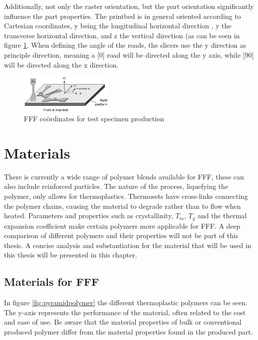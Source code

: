 Additionally, not only the raster orientation, but the part orientation significantly influence the part properties. The printbed is in general oriented according to Cartesian coordinates, y being the longitudinal horizontal direction , y the transverse horizontal direction, and z the vertical direction (as can be seen in figure \ref{fig:coordinates}. When defining the angle of the roads, the slicers use the y direction as principle direction, meaning a [0] road will be directed along the y axis, while [90] will be directed along the x direction. 


\begin{figure}[H]
    \centering
    \includegraphics[width=0.4\textwidth]{chapter_2/figures/Coordinates.png}
    \caption{FFF coördinates for test specimen production}
    \label{fig:coordinates}
\end{figure}


\section{Materials}
There is currently a wide range of polymer blends available for FFF, these can also include reinforced particles. The nature of the process, liquefying the polymer, only allows for thermoplastics. Thermosets have cross-links connecting the polymer chains, causing the material to degrade rather than to flow when heated. Parameters and properties such as crystallinity, $T_m$, $T_g$ and the thermal expansion coefficient make certain polymers more applicable for FFF.  A deep comparison of different polymers and their properties will not be part of this thesis. A concise analysis and substantiation for the material that will be used in this thesis will be presented in this chapter.

\subsection{Materials for FFF}
In figure \ref{fig:pyramidpolymer} the different thermoplastic polymers can be seen. The y-axis represents the performance of the material, often related to the cost and ease of use. Be aware that the material properties of bulk or conventional produced polymer differ from the material properties found in the produced part. 

